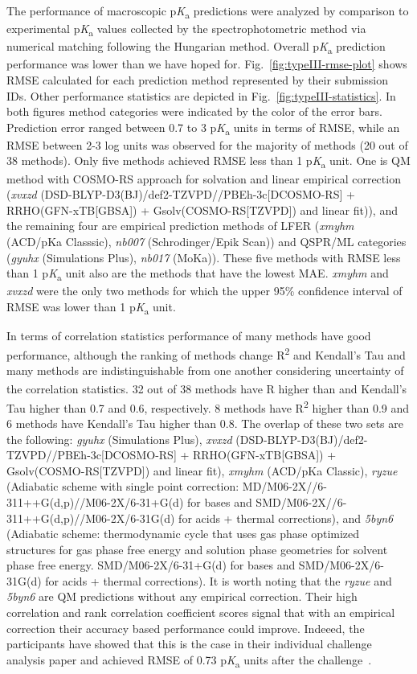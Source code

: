 \documentclass[9pt,lineno,final]{elife}
\newcommand{\pKa}{p\textit{K}\textsubscript{a}}
\begin{document}
The performance of macroscopic \pKa{} predictions were analyzed by comparison to experimental \pKa{} values collected by the spectrophotometric method via numerical matching following the Hungarian method.  
Overall \pKa{} prediction performance was lower than we have hoped for. 
Fig.~\ref{fig:typeIII-rmse-plot} shows RMSE calculated for each prediction method represented by their submission IDs. 
Other performance statistics are depicted in Fig.~\ref{fig:typeIII-statistics}.
In both figures method categories were indicated by the color of the error bars.  
Prediction error ranged between 0.7 to 3 \pKa{} units in terms of RMSE, while an RMSE between 2-3 log units was observed for the majority of methods (20 out of 38 methods). 
Only five methods achieved RMSE less than 1 \pKa{} unit. One is QM method with COSMO-RS approach for solvation and linear empirical correction (\textit{xvxzd} (DSD-BLYP-D3(BJ)/def2-TZVPD//PBEh-3c[DCOSMO-RS] + RRHO(GFN-xTB[GBSA]) + Gsolv(COSMO-RS[TZVPD]) and linear fit)), and the remaining four are empirical prediction methods of LFER (\textit{xmyhm} (ACD/pKa Classsic), \textit{nb007} (Schrodinger/Epik Scan)) and QSPR/ML categories (\textit{gyuhx} (Simulations Plus), \textit{nb017} (MoKa)). 
These five methods with RMSE less than 1 \pKa{} unit also are the methods that have the lowest MAE.
\textit{xmyhm} and \textit{xvxzd} were the only two methods for which the upper 95\% confidence interval of RMSE was lower than 1 \pKa{} unit. 

In terms of correlation statistics performance of many methods have good performance, although the ranking of methods change R\textsuperscript{2} and Kendall's Tau and many methods are indistinguishable from one another considering uncertainty of the correlation statistics. 
32 out of 38 methods have R\textsuperscript{} higher than and Kendall's Tau higher than 0.7 and 0.6, respectively.
8 methods have R\textsuperscript{2} higher than 0.9 and 6 methods have Kendall's Tau higher than 0.8.
The overlap of these two sets are the following:
\textit{gyuhx} (Simulations Plus), \textit{xvxzd} (DSD-BLYP-D3(BJ)/def2-TZVPD//PBEh-3c[DCOSMO-RS] + RRHO(GFN-xTB[GBSA]) + Gsolv(COSMO-RS[TZVPD]) and linear fit), \textit{xmyhm} (ACD/pKa Classic), \textit{ryzue} (Adiabatic scheme with single point correction: MD/M06-2X//6-311++G(d,p)//M06-2X/6-31+G(d) for bases and SMD/M06-2X//6-311++G(d,p)//M06-2X/6-31G(d) for acids + thermal corrections), and \textit{5byn6} 
(Adiabatic scheme: thermodynamic cycle that uses gas phase optimized structures for gas phase free energy and solution phase geometries for solvent phase free energy. SMD/M06-2X/6-31+G(d) for bases and SMD/M06-2X/6-31G(d) for acids + thermal corrections).
It is worth noting that the \textit{ryzue} and \textit{5byn6} are QM predictions without any empirical correction. Their high correlation and rank correlation coefficient scores signal that with an empirical correction their accuracy based performance could improve. Indeeed, the participants have showed that this is the case in their individual challenge analysis paper and achieved RMSE of 0.73 \pKa{} units after the challenge~\citep{Zeng:2018:J.Comput.AidedMol.Des.}.
\end{document}
